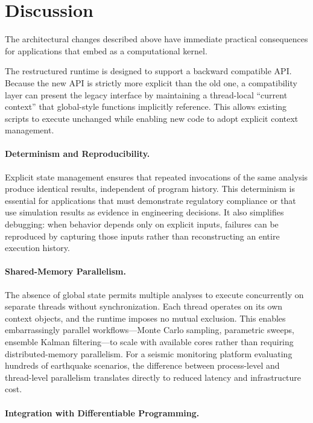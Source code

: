 \section{Discussion}
\label{sec:implications}

The architectural changes described above have immediate practical consequences for applications that embed \OpenSees{} as a computational kernel.

The restructured runtime is designed to support a backward compatible API. 
Because the new API is strictly more explicit than the old one, a compatibility layer can present the legacy interface by maintaining a thread-local ``current context'' that global-style functions implicitly reference. 
This allows existing scripts to execute unchanged while enabling new code to adopt explicit context management. 

\paragraph{Determinism and Reproducibility.}

Explicit state management ensures that repeated invocations of the same analysis produce identical results, independent of program history. This determinism is essential for applications that must demonstrate regulatory compliance or that use simulation results as evidence in engineering decisions. It also simplifies debugging: when behavior depends only on explicit inputs, failures can be reproduced by capturing those inputs rather than reconstructing an entire execution history.

\paragraph{Shared-Memory Parallelism.}

The absence of global state permits multiple analyses to execute concurrently on separate threads without synchronization. Each thread operates on its own context objects, and the runtime imposes no mutual exclusion. This enables embarrassingly parallel workflows---Monte Carlo sampling, parametric sweeps, ensemble Kalman filtering---to scale with available cores rather than requiring distributed-memory parallelism. For a seismic monitoring platform evaluating hundreds of earthquake scenarios, the difference between process-level and thread-level parallelism translates directly to reduced latency and infrastructure cost.

\paragraph{Integration with Differentiable Programming.}

